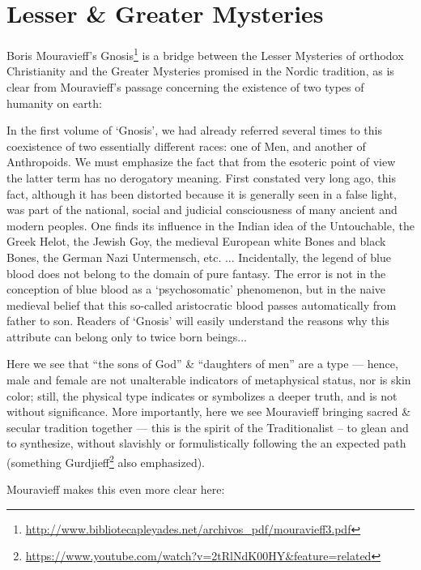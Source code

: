 \section{Lesser \& Greater Mysteries}

Boris Mouravieff's Gnosis\footnote{\url{http://www.bibliotecapleyades.net/archivos\_pdf/mouravieff3.pdf}} is a bridge between the Lesser Mysteries of orthodox Christianity and the Greater Mysteries promised in the Nordic tradition, as is clear from Mouravieff's passage concerning the existence of two types of humanity on earth:

\begin{quotex}
In the first volume of `Gnosis', we had already referred several times to this coexistence of two essentially different races: one of Men, and another of Anthropoids. We must emphasize the fact that from the esoteric point of view the latter term has no derogatory meaning. First constated very long ago, this fact, although it has been distorted because it is generally seen in a false light, was part of the national, social and judicial consciousness of many ancient and modern peoples. One finds its influence in the Indian idea of the Untouchable, the Greek Helot, the Jewish Goy, the medieval European white Bones and black Bones, the German Nazi Untermensch, etc. ... Incidentally, the legend of blue blood does not belong to the domain of pure fantasy. The error is not in the conception of blue blood as a `psychosomatic' phenomenon, but in the naive medieval belief that this so-called aristocratic blood passes automatically from father to son. Readers of `Gnosis' will easily understand the reasons why this attribute can belong only to twice born beings... 
\end{quotex}


Here we see that ``the sons of God'' \& ``daughters of men'' are a type --- hence, male and female are not unalterable indicators of metaphysical status, nor is skin color; still, the physical type indicates or symbolizes a deeper truth, and is not without significance. More importantly, here we see Mouravieff bringing sacred \& secular tradition together --- this is the spirit of the Traditionalist -- to glean and to synthesize, without slavishly or formulistically following the an expected path (something Gurdjieff\footnote{\url{https://www.youtube.com/watch?v=2tRlNdK00HY&feature=related}} also emphasized).

Mouravieff makes this even more clear here:

